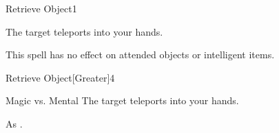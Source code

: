 \begin{spellsection}{Retrieve Object}{1}
    \begin{spellheader}
    \end{spellheader}
    \begin{spellcontent}
        \begin{spelltargetinginfo}
        \end{spelltargetinginfo}
        \begin{spelleffects}
            \spelleffect The target teleports into your hands.
        \end{spelleffects}
    \end{spellcontent}
    \begin{spellfooter}
        \spellnotes This spell has no effect on attended objects or intelligent items.
        \miscastrandom
    \end{spellfooter}
\end{spellsection}

\begin{spellsection}{Retrieve Object}[Greater]{4}
    \begin{spellheader}
    \end{spellheader}
    \begin{spellcontent}
        \begin{spelltargetinginfo}
        \end{spelltargetinginfo}
        \begin{spelleffects}
            \begin{spellattack}{Magic vs. Mental}
                \spellsuccess The target teleports into your hands.
            \end{spellattack}
        \end{spelleffects}
    \end{spellcontent}
    \begin{spellfooter}
        \spellnotes As .
        \miscastrandom
    \end{spellfooter}
\end{spellsection}


